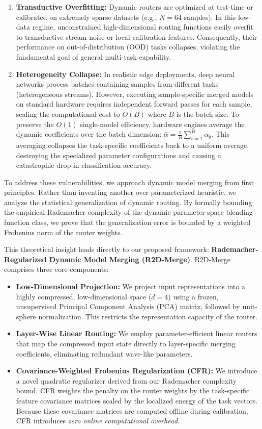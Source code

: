 \begin{enumerate}
    \item \textbf{Transductive Overfitting:} Dynamic routers are optimized at test-time or calibrated on extremely sparse datasets (e.g., $N=64$ samples). In this low-data regime, unconstrained high-dimensional routing functions easily overfit to transductive stream noise or local calibration features. Consequently, their performance on out-of-distribution (OOD) tasks collapses, violating the fundamental goal of general multi-task capability.
    \item \textbf{Heterogeneity Collapse:} In realistic edge deployments, deep neural networks process batches containing samples from different tasks (heterogeneous streams). However, executing sample-specific merged models on standard hardware requires independent forward passes for each sample, scaling the computational cost to $O(B)$ where $B$ is the batch size. To preserve the $O(1)$ single-model efficiency, hardware engines average the dynamic coefficients over the batch dimension: $\bar{\alpha} = \frac{1}{B} \sum_{b=1}^B \alpha_b$. This averaging collapses the task-specific coefficients back to a uniform average, destroying the specialized parameter configurations and causing a catastrophic drop in classification accuracy.
\end{enumerate}

To address these vulnerabilities, we approach dynamic model merging from first principles. Rather than inventing another over-parameterized heuristic, we analyze the statistical generalization of dynamic routing. By formally bounding the empirical Rademacher complexity of the dynamic parameter-space blending function class, we prove that the generalization error is bounded by a weighted Frobenius norm of the router weights. 

This theoretical insight leads directly to our proposed framework: \textbf{Rademacher-Regularized Dynamic Model Merging (R2D-Merge)}. R2D-Merge comprises three core components:
\begin{itemize}
    \item \textbf{Low-Dimensional Projection:} We project input representations into a highly compressed, low-dimensional space ($d = 4$) using a frozen, unsupervised Principal Component Analysis (PCA) matrix, followed by unit-sphere normalization. This restricts the representation capacity of the router.
    \item \textbf{Layer-Wise Linear Routing:} We employ parameter-efficient linear routers that map the compressed input state directly to layer-specific merging coefficients, eliminating redundant wave-like parameters.
    \item \textbf{Covariance-Weighted Frobenius Regularization (CFR):} We introduce a novel quadratic regularizer derived from our Rademacher complexity bound. CFR weights the penalty on the router weights by the task-specific feature covariance matrices scaled by the localized energy of the task vectors. Because these covariance matrices are computed offline during calibration, CFR introduces \emph{zero online computational overhead}.
\end{itemize}


